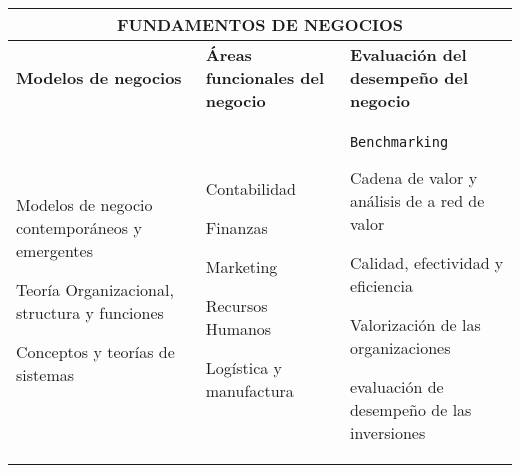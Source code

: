 \begin{center}
\begin{tabularx}{\textwidth}{|X|X|X|} \hline
\multicolumn{3}{|c|}{\textbf{FUNDAMENTOS DE NEGOCIOS}} \\ \hline
\textbf{Modelos de negocios} & \textbf{Áreas funcionales del negocio} & \textbf{Evaluación del desempeño del negocio} \\ \hline

\begin{capenv}
\item Modelos de negocio contemporáneos y emergentes
\item Teorí­a Organizacional, structura y funciones
\item Conceptos y teorí­as de sistemas
\end{capenv}
&
\begin{capenv}
\item Contabilidad
\item Finanzas
\item Marketing
\item Recursos Humanos
\item Logí­stica y manufactura
\end{capenv}
&
\begin{capenv}
\item \texttt{Benchmarking}
\item Cadena de valor y análisis de a red de valor 
\item Calidad, efectividad y eficiencia
\item Valorización de las organizaciones
\item evaluación de desempeño de las inversiones
\end{capenv} \\ \hline

\end{tabularx}
\end{center}

